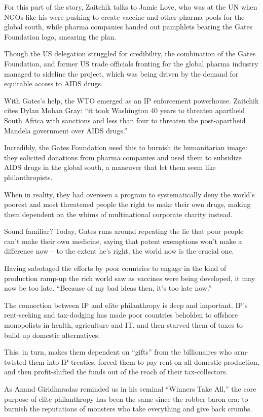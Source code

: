 \documentclass[
]{book}
\begin{document}
For this part of the story, Zaitchik talks to Jamie Love, who was at the UN when NGOs like his were pushing to create vaccine and other pharma pools for the global south, while pharma companies handed out pamphlets bearing the Gates Foundation logo, smearing the plan.

Though the US delegation struggled for credibility, the combination of the Gates Foundation, and former US trade officials fronting for the global pharma industry managed to sideline the project, which was being driven by the demand for equitable access to AIDS drugs.

With Gates's help, the WTO emerged as an IP enforcement powerhouse. Zaitchik cites Dylan Mohan Gray: ``it took Washington 40 years to threaten apartheid South Africa with sanctions and less than four to threaten the post-apartheid Mandela government over AIDS drugs.''

Incredibly, the Gates Foundation used this to burnish its humanitarian image: they solicited donations from pharma companies and used them to subsidize AIDS drugs in the global south, a maneuver that let them seem like philanthropists.

When in reality, they had overseen a program to systematically deny the world's poorest and most threatened people the right to make their own drugs, making them dependent on the whims of multinational corporate charity instead.

Sound familiar? Today, Gates runs around repeating the lie that poor people can't make their own medicine, saying that patent exemptions won't make a difference now -- to the extent he's right, the world now is the crucial one.

Having sabotaged the efforts by poor countries to engage in the kind of production ramp-up the rich world saw as vaccines were being developed, it may now be too late. ``Because of my bad ideas then, it's too late now.''

The connection between IP and elite philanthropy is deep and important. IP's rent-seeking and tax-dodging has made poor countries beholden to offshore monopolists in health, agriculture and IT, and then starved them of taxes to build up domestic alternatives.

This, in turn, makes them dependent on ``gifts'' from the billionaires who arm-twisted them into IP treaties, forced them to pay rent on all domestic production, and then profit-shifted the funds out of the reach of their tax-collectors.

As Anand Giridharadas reminded us in his seminal ``Winners Take All,'' the core purpose of elite philanthropy has been the same since the robber-baron era: to burnish the reputations of monsters who take everything and give back crumbs.
\end{document}
